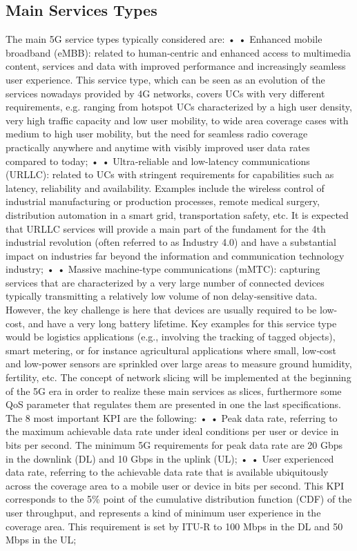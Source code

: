 \documentclass{article}
\begin{document}
\subsection{Main Services Types}
The main 5G service types typically considered are:
• • Enhanced mobile broadband (eMBB): related to human‐centric and enhanced access to multimedia content, services and data with improved performance and increasingly seamless user experience. This service type, which can be seen as an evolution of the services nowadays provided by
4G networks, covers UCs with very different requirements, e.g. ranging from hotspot UCs characterized by a high user density, very high traffic capacity and low user mobility, to wide area coverage cases with medium to high user mobility, but the need for seamless radio coverage practically
anywhere and anytime with visibly improved user data rates compared to today;
• • Ultra‐reliable and low-latency communications (URLLC): related to UCs with stringent requirements for capabilities such as latency, reliability and availability. Examples include the wireless
control of industrial manufacturing or production processes, remote medical surgery, distribution automation in a smart grid, transportation safety, etc. It is expected that URLLC services will provide a main part of the fundament for the 4th industrial revolution (often referred to as
Industry 4.0) and have a substantial impact on industries far beyond the information and communication technology industry;
• • Massive machine‐type communications (mMTC): capturing services that are characterized by
a very large number of connected devices typically transmitting a relatively low volume of non delay‐sensitive data. However, the key challenge is here that devices are usually required to be
low-cost, and have a very long battery lifetime. Key examples for this service type would be logistics applications (e.g., involving the tracking of tagged objects), smart metering, or for instance
agricultural applications where small, low‐cost and low‐power sensors are sprinkled over large
areas to measure ground humidity, fertility, etc.
The concept of network slicing will be implemented at the beginning of the 5G era in order to realize these main services as slices, furthermore some QoS parameter that regulates them are presented in one the last specifications. The 8 most important KPI are the following:
• •
 Peak data rate, referring to the maximum achievable data rate under ideal conditions per user or
device in bits per second. The minimum 5G requirements for peak data rate are 20 Gbps in the
downlink (DL) and 10 Gbps in the uplink (UL);
• •
 User experienced data rate, referring to the achievable data rate that is available ubiquitously
across the coverage area to a mobile user or device in bits per second. This KPI corresponds to the
5\% point of the cumulative distribution function (CDF) of the user throughput, and represents
a kind of minimum user experience in the coverage area. This requirement is set by ITU‐R to
100 Mbps in the DL and 50 Mbps in the UL;
\end{document}
